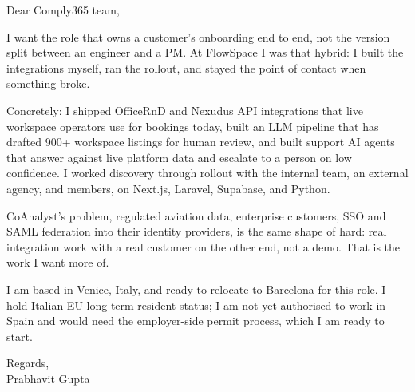 \documentclass[a4paper,11pt]{article}
\begin{document}
Dear Comply365 team,

I want the role that owns a customer's onboarding end to end, not the version split between an engineer and a PM. At FlowSpace I was that hybrid: I built the integrations myself, ran the rollout, and stayed the point of contact when something broke.

Concretely: I shipped OfficeRnD and Nexudus API integrations that live workspace operators use for bookings today, built an LLM pipeline that has drafted 900+ workspace listings for human review, and built support AI agents that answer against live platform data and escalate to a person on low confidence. I worked discovery through rollout with the internal team, an external agency, and members, on Next.js, Laravel, Supabase, and Python.

CoAnalyst's problem, regulated aviation data, enterprise customers, SSO and SAML federation into their identity providers, is the same shape of hard: real integration work with a real customer on the other end, not a demo. That is the work I want more of.

I am based in Venice, Italy, and ready to relocate to Barcelona for this role. I hold Italian EU long-term resident status; I am not yet authorised to work in Spain and would need the employer-side permit process, which I am ready to start.

Regards,\\
Prabhavit Gupta
\end{document}
